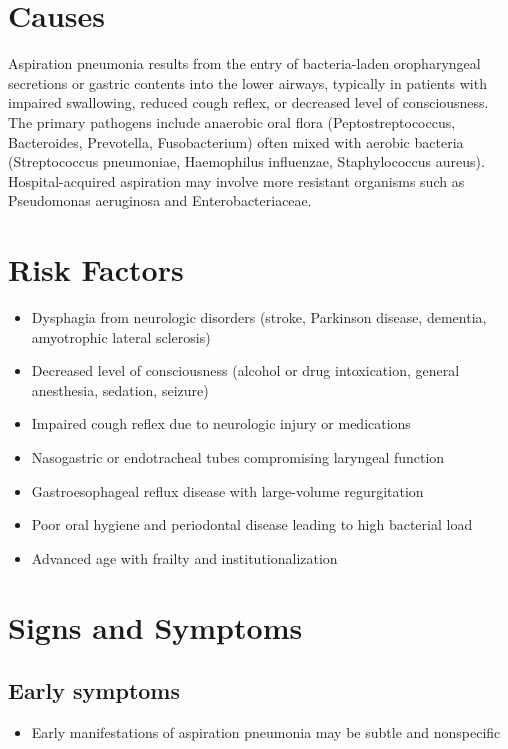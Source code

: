 \section{Causes}
Aspiration pneumonia results from the entry of bacteria-laden oropharyngeal secretions or gastric contents into the lower airways, typically in patients with impaired swallowing, reduced cough reflex, or decreased level of consciousness. The primary pathogens include anaerobic oral flora (Peptostreptococcus, Bacteroides, Prevotella, Fusobacterium) often mixed with aerobic bacteria (Streptococcus pneumoniae, Haemophilus influenzae, Staphylococcus aureus). Hospital-acquired aspiration may involve more resistant organisms such as Pseudomonas aeruginosa and Enterobacteriaceae.

\section{Risk Factors}

\begin{itemize}[noitemsep]
  \item Dysphagia from neurologic disorders (stroke, Parkinson disease, dementia, amyotrophic lateral sclerosis)
  \item Decreased level of consciousness (alcohol or drug intoxication, general anesthesia, sedation, seizure)
  \item Impaired cough reflex due to neurologic injury or medications
  \item Nasogastric or endotracheal tubes compromising laryngeal function
  \item Gastroesophageal reflux disease with large-volume regurgitation
  \item Poor oral hygiene and periodontal disease leading to high bacterial load
  \item Advanced age with frailty and institutionalization
\end{itemize}

\section{Signs and Symptoms}

\subsection{Early symptoms}
\begin{itemize}[noitemsep]
  \item Early manifestations of aspiration pneumonia may be subtle and nonspecific
\end{itemize}

